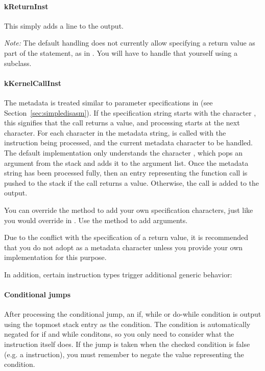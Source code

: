 \paragraph{kReturnInst}
This simply adds a line  to the output.

\emph{Note:} The default handling does not currently allow specifying a return value as part of the statement, as in . You will have to handle that yourself using a subclass.

\paragraph{kKernelCallInst}
The metadata is treated similar to parameter specifications in  (see Section~\vref{sec:simpledisasm}). If the specification string starts with the character , this signifies that the call returns a value, and processing starts at the next character.
For each character in the metadata string,  is called with the instruction being processed, and the current metadata character to be handled. The default implementation only understands the character , which pops an argument from the stack and adds it to the argument list.
Once the metadata string has been processed fully, then an entry representing the function call is pushed to the stack if the call returns a value. Otherwise, the call is added to the output.

You can override the  method to add your own specification characters, just like you would override  in . Use the  method to add arguments.

Due to the conflict with the specification of a return value, it is recommended that you do not adopt  as a metadata character unless you provide your own  implementation for this purpose.

In addition, certain instruction types trigger additional generic behavior:
\paragraph{Conditional jumps}
After processing the conditional jump, an if, while or do-while condition is output using the topmost stack entry as the condition. The condition is automatically negated for if and while conditons, so you only need to consider what the instruction itself does. If the jump is taken when the checked condition is false (e.g. a  instruction), you must remember to negate the value representing the condition.

